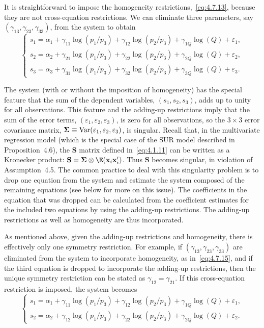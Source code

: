 It is straightforward to impose the homogeneity restrictions,~\eqref{eq:4.7.13},
because they are not cross-equation restrictions. We can eliminate three parameters,
say $(\gamma_{13}, \gamma_{23}, \gamma_{33})$, from the system to obtain
\begin{equation}
\begin{cases}
s_1 = \alpha_1 + \gamma_{11} \log(p_1/p_3)
+ \gamma_{12} \log(p_2/p_3) + \gamma_{1Q} \log(Q) + \varepsilon_1, \\
s_2 = \alpha_2 + \gamma_{21} \log(p_1/p_3)
+ \gamma_{22} \log(p_2/p_3) + \gamma_{2Q} \log(Q) + \varepsilon_2, \\
s_3 = \alpha_3 + \gamma_{31} \log(p_1/p_3)
+ \gamma_{32} \log(p_2/p_3) + \gamma_{3Q} \log(Q) + \varepsilon_3.
\end{cases}
\label{eq:4.7.15}
\end{equation}

The system (with or without the imposition of homogeneity) has the special
feature that the sum of the dependent variables, $(s_1, s_2, s_3)$, adds up to unity for
all observations. This feature and the adding-up restrictions imply that the sum of
the error terms, $(\varepsilon_1, \varepsilon_2, \varepsilon_3)$, is zero for all
observations, so the $3 \times 3$ error covariance matrix,
$\boldsymbol{\Sigma} \equiv \operatorname{Var}(\varepsilon_1, \varepsilon_2, \varepsilon_3)$,
is singular. Recall that, in the multivariate regression model (which is the special
case of the SUR model described in Proposition~4.6), the $\mathbf{S}$ matrix defined
in~\eqref{eq:4.1.11} can be written as a Kronecker product:
$\mathbf{S} = \boldsymbol{\Sigma} \otimes \E(\mathbf{x}_i \mathbf{x}_i')$.
Thus $\mathbf{S}$ becomes singular, in violation of Assumption~4.5. The common
practice to deal with this singularity problem is to drop one equation from the
system and estimate the system composed of the remaining equations (see below
for more on this issue). The coefficients in the equation that was dropped can be
calculated from the coefficient estimates for the included two equations by using
the adding-up restrictions. The adding-up restrictions as well as homogeneity are
thus incorporated.

As mentioned above, given the adding-up restrictions and homogeneity, there
is effectively only one symmetry restriction. For example, if $(\gamma_{13},
\gamma_{23}, \gamma_{33})$ are eliminated from the system to incorporate homogeneity,
as in~\eqref{eq:4.7.15}, and if the third equation is dropped to incorporate the
adding-up restrictions, then the unique symmetry restriction can be stated as
$\gamma_{12} = \gamma_{21}$. If this cross-equation restriction is imposed, the
system becomes
\begin{equation}
\begin{cases}
s_1 = \alpha_1 + \gamma_{11} \log(p_1/p_3)
+ \gamma_{12} \log(p_2/p_3) + \gamma_{1Q} \log(Q) + \varepsilon_1, \\
s_2 = \alpha_2 + \gamma_{12} \log(p_1/p_3)
+ \gamma_{22} \log(p_2/p_3) + \gamma_{2Q} \log(Q) + \varepsilon_2.
\end{cases}
\label{eq:4.7.16}
\end{equation}

